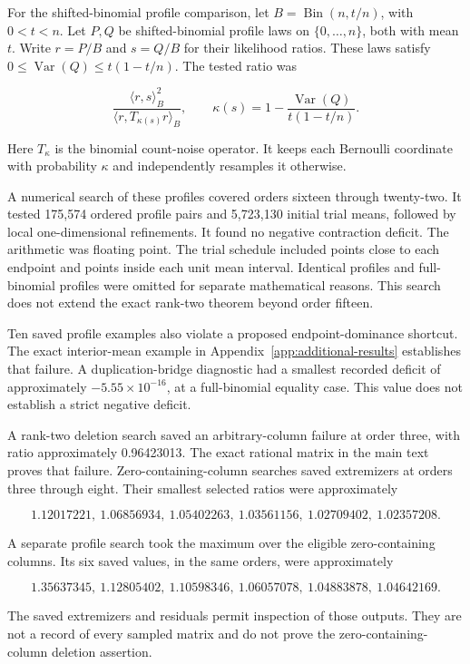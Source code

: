 For the shifted-binomial profile comparison, let \(B=\operatorname{Bin}(n,t/n)\), with \(0<t<n\). Let \(P,Q\) be shifted-binomial profile laws on \(\{0,\ldots,n\}\), both with mean \(t\). Write \(r=P/B\) and \(s=Q/B\) for their likelihood ratios. These laws satisfy \(0\le\operatorname{Var}(Q)\le t(1-t/n)\). The tested ratio was

\[
\frac{\langle r,s\rangle_B^2}{\langle r,T_{\kappa(s)}r\rangle_B},
\qquad
\kappa(s)=1-\frac{\operatorname{Var}(Q)}{t(1-t/n)}.
\]

Here \(T_\kappa\) is the binomial count-noise operator. It keeps each Bernoulli coordinate with probability \(\kappa\) and independently resamples it otherwise.

A numerical search of these profiles covered orders sixteen through twenty-two. It tested 175,574 ordered profile pairs and 5,723,130 initial trial means, followed by local one-dimensional refinements. It found no negative contraction deficit. The arithmetic was floating point. The trial schedule included points close to each endpoint and points inside each unit mean interval. Identical profiles and full-binomial profiles were omitted for separate mathematical reasons. This search does not extend the exact rank-two theorem beyond order fifteen.

Ten saved profile examples also violate a proposed endpoint-dominance shortcut. The exact interior-mean example in Appendix~\ref{app:additional-results} establishes that failure. A duplication-bridge diagnostic had a smallest recorded deficit of approximately \(-5.55\times10^{-16}\), at a full-binomial equality case. This value does not establish a strict negative deficit.

A rank-two deletion search saved an arbitrary-column failure at order three, with ratio approximately 0.96423013. The exact rational matrix in the main text proves that failure. Zero-containing-column searches saved extremizers at orders three through eight. Their smallest selected ratios were approximately

\[
1.12017221,\ 1.06856934,\ 1.05402263,\
1.03561156,\ 1.02709402,\ 1.02357208.
\]

A separate profile search took the maximum over the eligible zero-containing columns. Its six saved values, in the same orders, were approximately

\[
1.35637345,\ 1.12805402,\ 1.10598346,\
1.06057078,\ 1.04883878,\ 1.04642169.
\]

The saved extremizers and residuals permit inspection of those outputs. They are not a record of every sampled matrix and do not prove the zero-containing-column deletion assertion.

